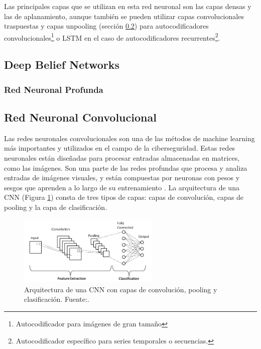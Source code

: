 Las principales capas que se utilizan en esta red neuronal son las capas densas y las de aplanamiento, aunque también se pueden utilizar capas convolucionales traspuestas y capas unpooling (sección \ref{sec:2.CNN}) para autocodificadores convolucionales\footnote{Autocodificador para imágenes de gran tamaño} o LSTM en el caso de autocodificadores recurrentes\footnote{Autocodificador específico para series temporales o secuencias.}\citep{geron2022hands}. 




\subsection{Deep Belief Networks}
\subsubsection{Red Neuronal Profunda}
\subsection{Red Neuronal Convolucional} \label{sec:2.CNN}


Las redes neuronales convolucionales son una de las métodos de machine learning más importantes y utilizados en el campo de la ciberseguridad. Estas redes neuronales están diseñadas para procesar entradas almacenadas en matrices, como las imágenes.  Son una parte de las redes profundas que procesa y analiza entradas de imágenes visuales, y están compuestas por neuronas con pesos y sesgos que aprenden a lo largo de su entrenamiento \citep{podder2021artificial}. La arquitectura de una CNN (Figura \ref{fig:cnn_architecture}) consta de tres tipos de capas: capas de convolución, capas de pooling y la capa de clasificación. 
 

\begin{figure}[h]
    \centering
    \includegraphics[width=0.6\textwidth]{img/convlayers.png}
    \caption{Arquitectura de una CNN con capas de convolución, pooling y clasificación. Fuente:\citep{phung2018deep}.}
    \label{fig:cnn_architecture}
\end{figure}

